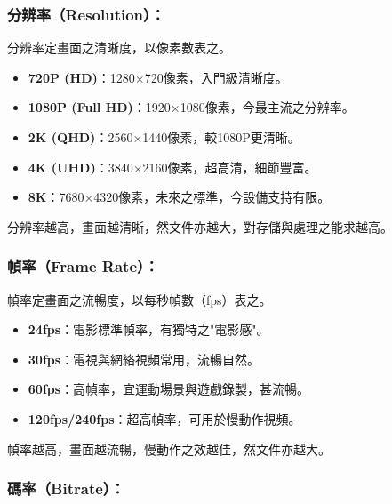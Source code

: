 


\subsubsection*{分辨率（Resolution）：}

分辨率定畫面之清晰度，以像素數表之。

\begin{itemize}
  \item \textbf{720P (HD)}：1280×720像素，入門級清晰度。
  \item \textbf{1080P (Full HD)}：1920×1080像素，今最主流之分辨率。
  \item \textbf{2K (QHD)}：2560×1440像素，較1080P更清晰。
  \item \textbf{4K (UHD)}：3840×2160像素，超高清，細節豐富。
  \item \textbf{8K}：7680×4320像素，未來之標準，今設備支持有限。
\end{itemize}

分辨率越高，畫面越清晰，然文件亦越大，對存儲與處理之能求越高。

\subsubsection*{幀率（Frame Rate）：}

幀率定畫面之流暢度，以每秒幀數（fps）表之。

\begin{itemize}
  \item \textbf{24fps}：電影標準幀率，有獨特之"電影感"。
  \item \textbf{30fps}：電視與網絡視頻常用，流暢自然。
  \item \textbf{60fps}：高幀率，宜運動場景與遊戲錄製，甚流暢。
  \item \textbf{120fps/240fps}：超高幀率，可用於慢動作視頻。
\end{itemize}

幀率越高，畫面越流暢，慢動作之效越佳，然文件亦越大。

\subsubsection*{碼率（Bitrate）：}

